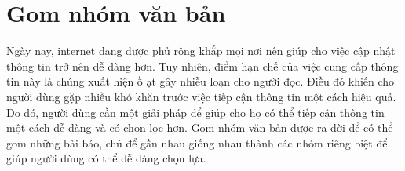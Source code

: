 

%

\section{Gom nhóm văn bản}
Ngày nay, internet đang được phủ rộng khắp mọi nơi nên giúp cho việc cập nhật thông tin trở nên dễ dàng hơn.
Tuy nhiên, điểm hạn chế của việc cung cấp thông tin này là chúng xuất hiện ồ ạt gây nhiễu loạn cho người đọc.
Điều đó khiến cho người dùng gặp nhiều khó khăn trước việc tiếp cận thông tin một cách hiệu quả.
Do đó, người dùng cần một giải pháp để giúp cho họ có thể tiếp cận thông tin một cách dễ dàng và có chọn lọc hơn.
Gom nhóm văn bản được ra đời để có thể gom những bài báo, chủ để gần nhau giống nhau thành các nhóm riêng biệt để giúp người dùng có thể dễ dàng chọn lựa.

